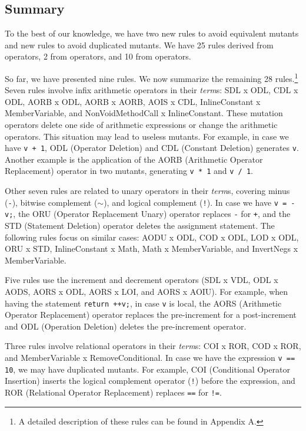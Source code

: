 \subsection{Summary}
\label{sec:rules-summary}

To the best of our knowledge, we have two new rules to avoid equivalent mutants and \NumberOfNewRulesForDuplicated new rules to avoid duplicated mutants. 
We have 25 rules derived from \mujava{} operators, 2 from \major{} operators, and 10 from \pit{} operators.

So far, we have presented nine rules. 
We now summarize the remaining 28 rules.\footnote{A detailed description of these rules can be found in Appendix A.} 
Seven rules involve infix arithmetic operators in their \textit{term}s: SDL x ODL, CDL x ODL, AORB x ODL, AORB x AORB, AOIS x CDL, InlineConstant x MemberVariable, and NonVoidMethodCall x InlineConstant. 
These mutation operators delete one side of arithmetic expressions or change the arithmetic operators. 
This situation may lead to useless mutants. 
For example, in case we have \texttt{v + 1}, ODL (Operator Deletion) and CDL (Constant Deletion) generates \texttt{v}. 
Another example is the application of the AORB (Arithmetic Operator Replacement) operator in two mutants, generating \texttt{v * 1} and \texttt{v / 1}.

Other seven rules are related to unary operators in their \textit{term}s, covering minus (\texttt{-}), bitwise complement (\texttt{$\sim$}), and logical complement (\texttt{!}). 
In case we have \texttt{v = -v;}, the ORU (Operator Replacement Unary) operator replaces \texttt{-} for \texttt{+}, and the STD (Statement Deletion) operator deletes the assignment statement. 
The following rules focus on similar cases: AODU x ODL, COD x ODL, LOD x ODL, ORU x STD, InlineConstant x Math, Math x MemberVariable, and InvertNegs x MemberVariable.

Five rules use the increment and decrement operators (SDL x VDL, ODL x AODS, AORS x ODL, AORS x LOI, and AORS x AOIU). 
For example, when having the statement \texttt{return ++v;}, in case \texttt{v} is local, the AORS (Arithmetic Operator Replacement) operator replaces the pre-increment for a post-increment and ODL (Operation Deletion) deletes the pre-increment operator.

Three rules involve relational operators in their \textit{term}s: COI x ROR, COD x ROR, and MemberVariable x RemoveConditional. 
In case we have the expression \texttt{v == 10}, we may have duplicated mutants. 
For example, COI (Conditional Operator Insertion) inserts the logical complement operator (\texttt{!}) before the expression, and ROR (Relational Operator Replacement) replaces  \texttt{==} for \texttt{!=}.

